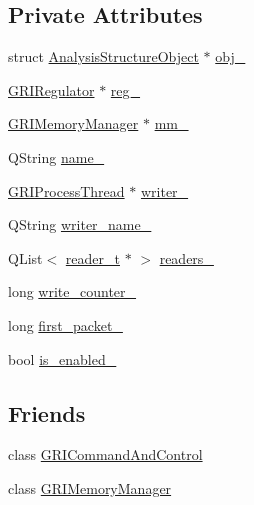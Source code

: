\subsection*{\-Private \-Attributes}
\begin{DoxyCompactItemize}
\item 
struct \hyperlink{structAnalysisStructureObject}{\-Analysis\-Structure\-Object} $\ast$ \hyperlink{classGRIDataBlock_a967f14cfd43d3eae26444741f50ebd0e}{obj\-\_\-}
\item 
\hyperlink{classGRIRegulator}{\-G\-R\-I\-Regulator} $\ast$ \hyperlink{classGRIDataBlock_ab023a641f8c1bd668f4b830049f97253}{reg\-\_\-}
\item 
\hyperlink{classGRIMemoryManager}{\-G\-R\-I\-Memory\-Manager} $\ast$ \hyperlink{classGRIDataBlock_a5c80adb5907a0bbda4fd75598aff0176}{mm\-\_\-}
\item 
\-Q\-String \hyperlink{classGRIDataBlock_ac964c1f2b5ddb97b8ef333f481687f99}{name\-\_\-}
\item 
\hyperlink{classGRIProcessThread}{\-G\-R\-I\-Process\-Thread} $\ast$ \hyperlink{classGRIDataBlock_a7e302800f9de02e958c6b66857f5df39}{writer\-\_\-}
\item 
\-Q\-String \hyperlink{classGRIDataBlock_ad2d65d8c5f401bf5726f5a7fd6478e62}{writer\-\_\-name\-\_\-}
\item 
\-Q\-List$<$ \hyperlink{structreader__t}{reader\-\_\-t} $\ast$ $>$ \hyperlink{classGRIDataBlock_a15b74c7d6fecf83a713ca9bf3b1bbf0f}{readers\-\_\-}
\item 
long \hyperlink{classGRIDataBlock_a76ade2e1bd0d1db89d108f58deee637b}{write\-\_\-counter\-\_\-}
\item 
long \hyperlink{classGRIDataBlock_a5751612837ed2f69ddfaf6d2cdfe511f}{first\-\_\-packet\-\_\-}
\item 
bool \hyperlink{classGRIDataBlock_a0d33bf9305eab45c3368138490342d5a}{is\-\_\-enabled\-\_\-}
\end{DoxyCompactItemize}
\subsection*{\-Friends}
\begin{DoxyCompactItemize}
\item 
class \hyperlink{classGRIDataBlock_ae5d9162c1cf3d4e10a949c025ad576d7}{\-G\-R\-I\-Command\-And\-Control}
\item 
class \hyperlink{classGRIDataBlock_ae3ac15336420ab6b5b09c1d69f48a11f}{\-G\-R\-I\-Memory\-Manager}
\end{DoxyCompactItemize}


